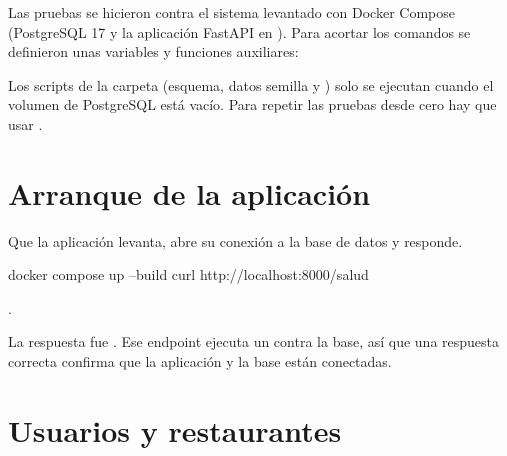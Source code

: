 \documentclass[11pt]{article}
\begin{document}
Las pruebas se hicieron contra el sistema levantado con Docker Compose (PostgreSQL 17 y la
aplicación FastAPI en ). Para acortar los comandos se definieron unas
variables y funciones auxiliares:


\begin{nota}
Los scripts de la carpeta  (esquema, datos semilla y ) solo se ejecutan cuando el
volumen de PostgreSQL está vacío. Para repetir las pruebas desde cero hay que usar
\cod{docker compose down -v}.
\end{nota}

\section{Arranque de la aplicación}

\queria Que la aplicación levanta, abre su conexión a la base de datos y responde.

\begin{comando}
docker compose up --build
curl http://localhost:8000/salud
\end{comando}

\esperado {}.

\observado La respuesta fue . Ese endpoint ejecuta un  contra la
base, así que una respuesta correcta confirma que la aplicación y la base están conectadas.


\section{Usuarios y restaurantes}
\end{document}
